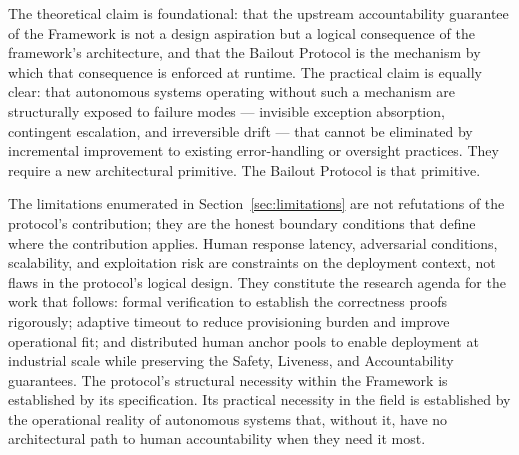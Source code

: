 The theoretical claim is foundational: that the upstream accountability guarantee of the \bxthree{} Framework is not a design aspiration but a logical consequence of the framework's architecture, and that the Bailout Protocol is the mechanism by which that consequence is enforced at runtime. The practical claim is equally clear: that autonomous systems operating without such a mechanism are structurally exposed to failure modes — invisible exception absorption, contingent escalation, and irreversible drift — that cannot be eliminated by incremental improvement to existing error-handling or oversight practices. They require a new architectural primitive. The Bailout Protocol is that primitive.

The limitations enumerated in Section~\ref{sec:limitations} are not refutations of the protocol's contribution; they are the honest boundary conditions that define where the contribution applies. Human response latency, adversarial conditions, scalability, and exploitation risk are constraints on the deployment context, not flaws in the protocol's logical design. They constitute the research agenda for the work that follows: formal verification to establish the correctness proofs rigorously; adaptive timeout to reduce provisioning burden and improve operational fit; and distributed human anchor pools to enable deployment at industrial scale while preserving the Safety, Liveness, and Accountability guarantees. The protocol's structural necessity within the \bxthree{} Framework is established by its specification. Its practical necessity in the field is established by the operational reality of autonomous systems that, without it, have no architectural path to human accountability when they need it most.